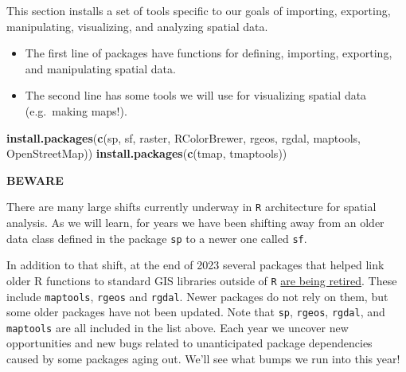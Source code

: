 \documentclass[
]{book}
\newenvironment{Shaded}{\begin{snugshade}}{\end{snugshade}}
\newcommand{\FunctionTok}[1]{\textcolor[rgb]{0.13,0.29,0.53}{\textbf{#1}}}
\newcommand{\NormalTok}[1]{#1}
\newcommand{\StringTok}[1]{\textcolor[rgb]{0.31,0.60,0.02}{#1}}
\providecommand{\tightlist}{%
  \setlength{\itemsep}{0pt}\setlength{\parskip}{0pt}}
\newenvironment{rmdcaution}[1]
  {
  \begin{itemize}
  \renewcommand{\labelitemi}{
    \raisebox{-.7\height}[0pt][0pt]{
      {\setkeys{Gin}{width=3em,keepaspectratio}\texttt{[image: images/\#1]}}
    }
  }
  \setlength{\fboxsep}{1em}
  \begin{caution}
  \item
  }
  {
  \end{caution}
  \end{itemize}
  }
\begin{document}
This section installs a set of tools specific to our goals of importing, exporting, manipulating, visualizing, and analyzing spatial data.

\begin{itemize}
\tightlist
\item
  The first line of packages have functions for defining, importing, exporting, and manipulating spatial data.
\item
  The second line has some tools we will use for visualizing spatial data (e.g.~making maps!).
\end{itemize}

\begin{Shaded}
\begin{Highlighting}[]
\FunctionTok{install.packages}\NormalTok{(}\FunctionTok{c}\NormalTok{(}\StringTok{\textquotesingle{}sp\textquotesingle{}}\NormalTok{, }\StringTok{\textquotesingle{}sf\textquotesingle{}}\NormalTok{, }\StringTok{\textquotesingle{}raster\textquotesingle{}}\NormalTok{, }\StringTok{\textquotesingle{}RColorBrewer\textquotesingle{}}\NormalTok{, }\StringTok{\textquotesingle{}rgeos\textquotesingle{}}\NormalTok{, }\StringTok{\textquotesingle{}rgdal\textquotesingle{}}\NormalTok{, }\StringTok{\textquotesingle{}maptools\textquotesingle{}}\NormalTok{, }\StringTok{\textquotesingle{}OpenStreetMap\textquotesingle{}}\NormalTok{))  }
\FunctionTok{install.packages}\NormalTok{(}\FunctionTok{c}\NormalTok{(}\StringTok{\textquotesingle{}tmap\textquotesingle{}}\NormalTok{, }\StringTok{\textquotesingle{}tmaptools\textquotesingle{}}\NormalTok{)) }
\end{Highlighting}
\end{Shaded}

\begin{rmdcaution}{caution}
\textbf{BEWARE}

There are many large shifts currently underway in \texttt{R} architecture for spatial analysis. As we will learn, for years we have been shifting away from an older data class defined in the package \texttt{sp} to a newer one called \texttt{sf}.

In addition to that shift, at the end of 2023 several packages that helped link older R functions to standard GIS libraries outside of \texttt{R} \href{https://r-spatial.org/r/2022/04/12/evolution.html}{are being retired}. These include \texttt{maptools}, \texttt{rgeos} and \texttt{rgdal}. Newer packages do not rely on them, but some older packages have not been updated. Note that \texttt{sp}, \texttt{rgeos}, \texttt{rgdal}, and \texttt{maptools} are all included in the list above. Each year we uncover new opportunities and new bugs related to unanticipated package dependencies caused by some packages aging out. We'll see what bumps we run into this year!

\end{rmdcaution}
\end{document}
